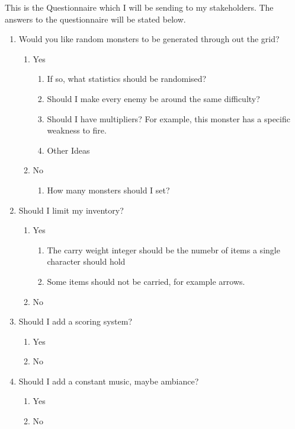 \documentclass[14pt]{article}
\begin{document}
This is the Questionnaire which I will be sending to my stakeholders. The answers to the questionnaire will be stated below.

\begin{enumerate}
	\item{Would you like random monsters to be generated through out the grid?}
		\begin{enumerate}
		\item Yes
			\begin{enumerate}
				\item If so, what statistics should be randomised?
				\item Should I make every enemy be around the same difficulty?
				\item Should I have multipliers? For example, this monster has a specific weakness to fire.
				\item Other Ideas
			\end{enumerate}
		\item No
			\begin{enumerate}
				\item How many monsters should I set?
			\end{enumerate}
		\end{enumerate}

			
	\item{Should I limit my inventory?}
		\begin{enumerate}
		\item Yes
			\begin{enumerate}
				\item The carry weight integer should be the numebr of items a single character should hold
				\item Some items should not be carried, for example arrows. 
			\end{enumerate}
		\item No
		\end{enumerate}
			
	\item{Should I add a scoring system?}
		\begin{enumerate}
		\item Yes
		\item No
		\end{enumerate}
			
	\item{Should I add a constant music, maybe ambiance?}
		\begin{enumerate}
		\item Yes
		\item No
		\end{enumerate}
				

\end{enumerate}
\end{document}
